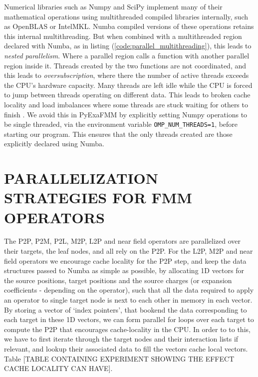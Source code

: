 \documentclass{IEEEcsmag}
\begin{document}
Numerical libraries such as Numpy and SciPy implement many of their mathematical operations using multithreaded compiled libraries internally, such as OpenBLAS or IntelMKL. Numba compiled versions of these operations retains this internal multithreading. But when combined with a multithreaded region declared with Numba, as in listing (\ref{code:parallel_multithreading}), this leads to \textit{nested parallelism}. Where a parallel region calls a function with another parallel region inside it. Threads created by the two functions are not coordinated, and this leads to \textit{oversubscription}, where there the number of active threads exceeds the CPU's hardware capacity. Many threads are left idle while the CPU is forced to jump between threads operating on different data. This leads to broken cache locality and load imbalances where some threads are stuck waiting for others to finish \cite{Malakhov2016}. We avoid this in PyExaFMM by explicitly setting Numpy operations to be single threaded, via the environment variable \lstinline{OMP_NUM_THREADS=1}, before starting our program. This ensures that the only threads created are those explicitly declared using Numba.



\section{PARALLELIZATION STRATEGIES FOR FMM OPERATORS}

The P2P, P2M, P2L, M2P, L2P and near field operators are parallelized over their targets, the leaf nodes, and all rely on the P2P. For the L2P, M2P and near field operators we encourage cache locality for the P2P step, and keep the data structures passed to Numba as simple as possible, by allocating 1D vectors for the source positions, target positions and the source charges (or expansion coefficients - depending on the operator), such that all the data required to apply an operator to single target node is next to each other in memory in each vector. By storing a vector of `index pointers', that bookend the data corresponding to each target in these 1D vectors, we can form parallel for loops over each target to compute the P2P that encourages cache-locality in the CPU. In order to to this, we have to first iterate through the target nodes and their interaction lists if relevant, and lookup their associated data to fill the vectors cache local vectors. Table [TABLE CONTAINING EXPERIMENT SHOWING THE EFFECT CACHE LOCALITY CAN HAVE].
\end{document}
